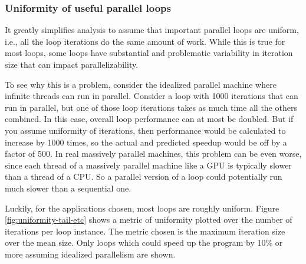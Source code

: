 \documentclass[12pt,twoside]{reedthesis}
\begin{document}
		
		
		
		
		
		

		
		\subsubsection{Uniformity of useful parallel loops}
		
		It greatly simplifies analysis to assume that important parallel loops are uniform, i.e., all the loop iterations do the same amount of work. While this is true for most loops, some loops have substantial and problematic variability in iteration size that can impact parallelizability. 
			
		To see why this is a problem, consider the idealized parallel machine where infinite threads can run in parallel. Consider a loop with 1000 iterations that can run in parallel, but one of those loop iterations takes as much time all the others combined. In this case, overall loop performance can at most be doubled. But if you assume uniformity of iterations, then performance would be calculated to increase by 1000 times, so the actual and predicted speedup would be off by a factor of 500. In real massively parallel machines, this problem can be even worse, since each thread of a massively parallel machine like a GPU is typically slower than a thread of a CPU. So a parallel version of a loop could potentially run much slower than a sequential one. 
		
		Luckily, for the applications chosen, most loops are roughly uniform. Figure \ref{fig:uniformity-tail-etc} shows a metric of uniformity plotted over the number of iterations per loop instance. The metric chosen is the maximum iteration size over the mean size. Only loops which could speed up the program by 10\% or more assuming idealized parallelism are shown. 
		
\end{document}
